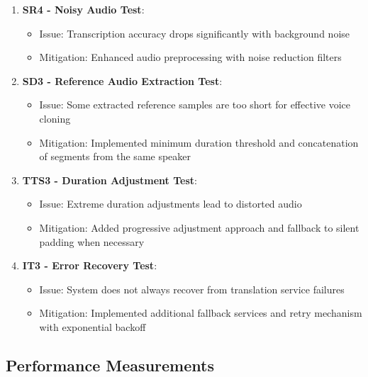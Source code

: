 \documentclass[11pt,a4paper]{article}
\begin{document}
\begin{enumerate}
    \item \textbf{SR4 - Noisy Audio Test}: 
    \begin{itemize}
        \item Issue: Transcription accuracy drops significantly with background noise
        \item Mitigation: Enhanced audio preprocessing with noise reduction filters
    \end{itemize}
    
    \item \textbf{SD3 - Reference Audio Extraction Test}: 
    \begin{itemize}
        \item Issue: Some extracted reference samples are too short for effective voice cloning
        \item Mitigation: Implemented minimum duration threshold and concatenation of segments from the same speaker
    \end{itemize}
    
    \item \textbf{TTS3 - Duration Adjustment Test}: 
    \begin{itemize}
        \item Issue: Extreme duration adjustments lead to distorted audio
        \item Mitigation: Added progressive adjustment approach and fallback to silent padding when necessary
    \end{itemize}
    
    \item \textbf{IT3 - Error Recovery Test}: 
    \begin{itemize}
        \item Issue: System does not always recover from translation service failures
        \item Mitigation: Implemented additional fallback services and retry mechanism with exponential backoff
    \end{itemize}
\end{enumerate}

\subsection{Performance Measurements}
\end{document}
